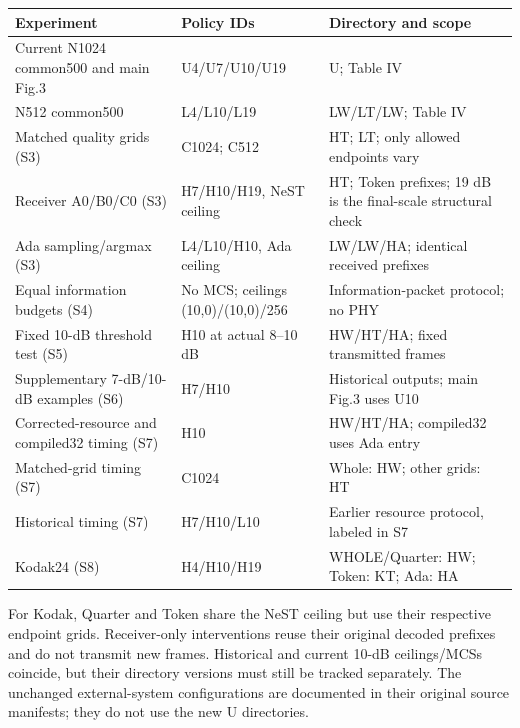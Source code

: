 \begin{longtable}{@{}p{6.2cm}p{3.1cm}p{6.0cm}@{}}\toprule
Experiment & Policy IDs & Directory and scope\\\midrule\endhead
Current N1024 common500 and main Fig.3 & U4/U7/U10/U19 & U; Table IV\\
N512 common500 & L4/L10/L19 & LW/LT/LW; Table IV\\
Matched quality grids (S3) & C1024; C512 & HT; LT; only allowed endpoints vary\\
Receiver A0/B0/C0 (S3) & H7/H10/H19, NeST ceiling & HT; Token prefixes; 19 dB is the final-scale structural check\\
Ada sampling/argmax (S3) & L4/L10/H10, Ada ceiling & LW/LW/HA; identical received prefixes\\
Equal information budgets (S4) & No MCS; ceilings (10,0)/(10,0)/256 & Information-packet protocol; no PHY\\
Fixed 10-dB threshold test (S5) & H10 at actual 8--10 dB & HW/HT/HA; fixed transmitted frames\\
Supplementary 7-dB/10-dB examples (S6) & H7/H10 & Historical outputs; main Fig.3 uses U10\\
Corrected-resource and compiled32 timing (S7) & H10 & HW/HT/HA; compiled32 uses Ada entry\\
Matched-grid timing (S7) & C1024 & Whole: HW; other grids: HT\\
Historical timing (S7) & H7/H10/L10 & Earlier resource protocol, labeled in S7\\
Kodak24 (S8) & H4/H10/H19 & WHOLE/Quarter: HW; Token: KT; Ada: HA\\
\bottomrule\end{longtable}
For Kodak, Quarter and Token share the NeST ceiling but use their respective endpoint grids. Receiver-only interventions reuse their original decoded prefixes and do not transmit new frames. Historical and current 10-dB ceilings/MCSs coincide, but their directory versions must still be tracked separately. The unchanged external-system configurations are documented in their original source manifests; they do not use the new U directories.
